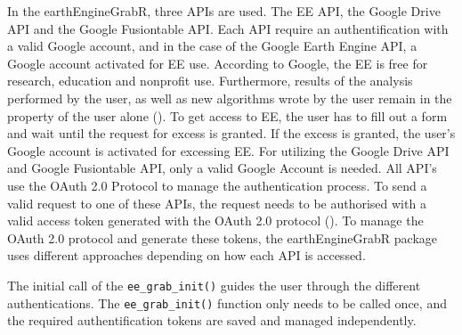 In the earthEngineGrabR, three APIs are used. The EE API, the Google Drive API and the Google Fusiontable API. Each API require an authentification with a valid Google account, and in the case of the Google Earth Engine API, a Google account activated for EE use. According to Google, the EE is free for research, education and nonprofit use. Furthermore, results of the analysis performed by the user, as well as new algorithms wrote by the user remain in the property of the user alone (\cite{terms}).
To get access to EE, the user has to fill out a form and wait until the request for excess is granted. If the excess is granted, the user's Google account is activated for excessing EE. For utilizing the Google Drive API and Google Fusiontable API, only a valid Google Account is needed. All API's use the OAuth 2.0 Protocol to manage the authentication process. To send a valid request to one of these APIs, the request needs to be authorised with a valid access token generated with the OAuth 2.0 protocol (\cite{hardt2012oauth}). To manage the OAuth 2.0 protocol and generate these tokens, the earthEngineGrabR package uses different approaches depending on how each API is accessed. 

The initial call of the \texttt{ee\_grab\_init()} guides the user through the different authentications. The \texttt{ee\_grab\_init()} function only needs to be called once, and the required authentification tokens are saved and managed independently. 





